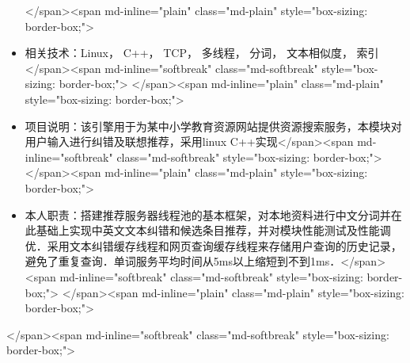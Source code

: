\begin{itemize}
</span><span md-inline="plain" class="md-plain" style="box-sizing: border-box;">  \item 相关技术：Linux， C++， TCP， 多线程， 分词， 文本相似度， 索引</span><span md-inline="softbreak" class="md-softbreak" style="box-sizing: border-box;">
</span><span md-inline="plain" class="md-plain" style="box-sizing: border-box;">  \item 项目说明：该引擎用于为某中小学教育资源网站提供资源搜索服务，本模块对用户输入进行纠错及联想推荐，采用linux C++实现</span><span md-inline="softbreak" class="md-softbreak" style="box-sizing: border-box;">
</span><span md-inline="plain" class="md-plain" style="box-sizing: border-box;">  \item 本人职责：搭建推荐服务器线程池的基本框架，对本地资料进行中文分词并在此基础上实现中英文文本纠错和候选条目推荐，并对模块性能测试及性能调优．采用文本纠错缓存线程和网页查询缓存线程来存储用户查询的历史记录，避免了重复查询．单词服务平均时间从5ms以上缩短到不到1ms．</span><span md-inline="softbreak" class="md-softbreak" style="box-sizing: border-box;">
</span><span md-inline="plain" class="md-plain" style="box-sizing: border-box;">\end{itemize}</span><span md-inline="softbreak" class="md-softbreak" style="box-sizing: border-box;">
